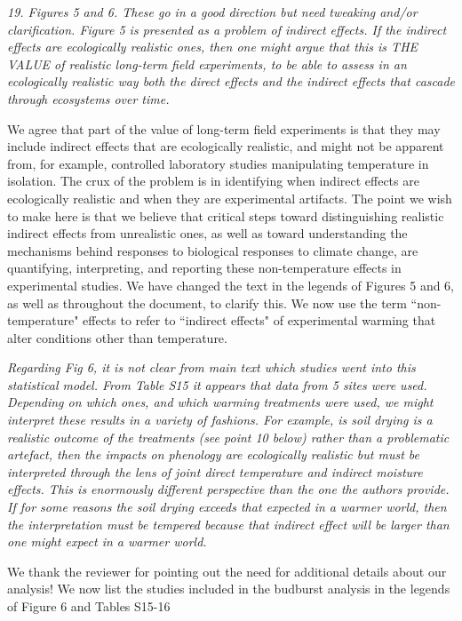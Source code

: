 \documentclass[11pt,a4paper]{letter}
\begin{document}
\emph{19. Figures 5 and 6. These go in a good direction but need tweaking and/or clarification. Figure 5 is presented as a
problem of indirect effects. If the indirect effects are ecologically realistic ones, then one might
argue that this is THE VALUE of realistic long-term field experiments, to be able to assess in an
ecologically realistic way both the direct effects and the indirect effects that cascade through
ecosystems over time.}

We agree that part of the value of long-term field experiments is that they may include indirect effects that are ecologically realistic, and might not be apparent from, for example, controlled laboratory studies manipulating temperature in isolation. The crux of the problem is in identifying when indirect effects are ecologically realistic and when they are experimental artifacts. The point we wish to make here is that we believe that critical steps toward distinguishing realistic indirect effects from unrealistic ones, as well as toward understanding the mechanisms behind responses to biological responses to climate change, are quantifying, interpreting, and reporting these non-temperature effects in experimental studies. We have changed the text in the legends of Figures 5 and 6, as well as throughout the document, to clarify this. We now use the term ``non-temperature" effects to refer to ``indirect effects" of experimental warming that alter conditions other than temperature. 

\emph{Regarding Fig 6, it is not clear from main text which studies went into this statistical model. From Table S15 it appears that data from 5 sites were used. Depending on which ones, and which warming treatments were used, we might interpret these results in a variety of fashions. For example, is soil drying is a realistic outcome of the treatments (see point 10 below) rather than a problematic artefact, then the impacts on phenology are ecologically realistic but must be interpreted through the lens of joint direct temperature and indirect moisture effects. This is enormously different perspective than the one the authors provide. If for some reasons the soil drying exceeds that expected in a warmer world, then the interpretation must be tempered because that indirect effect will be larger than one might expect in a warmer world.}

\par We thank the reviewer for pointing out the need for additional details about our analysis! We now list the studies included in the budburst analysis in the legends of Figure 6 and Tables S15-16
\end{document}
